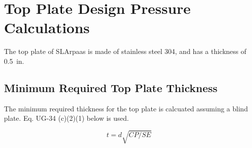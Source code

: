 \section{Top Plate Design Pressure Calculations}
\label{app:top_plate}

The top plate of SLArpaas is made of stainless steel 304, and has
a thickness of 0.5~in.

\subsection{Minimum Required Top Plate Thickness}
\label{app:blind_flange}

The minimum required thickness for the top plate is calcuated assuming
a blind plate.  Eq. UG-34 (c)(2)(1) below is used.

\begin{equation}
    t= d\sqrt{CP/SE}
\end{equation}

